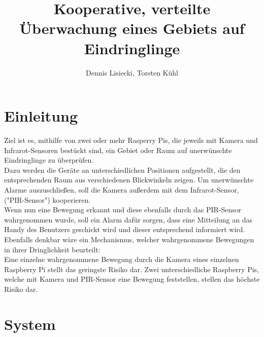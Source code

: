 \documentclass[journal]{IEEEtran}
\title{Kooperative, verteilte Überwachung eines Gebiets auf Eindringlinge}		%
\author{Dennis Lisiecki, Torsten Kühl}								%
\begin{document}

\maketitle	%




\section{Einleitung} 
Ziel ist es, mithilfe von zwei oder mehr Rasperry Pis, die jeweils mit Kamera und Infrarot-Sensoren bestückt sind, ein Gebiet oder Raum auf unerwünschte Eindringlinge zu überprüfen.\\ Dazu werden die Geräte an unterschiedlichen Positionen aufgestellt, die den entsprechenden Raum aus verschiedenen Blickwinkeln zeigen. Um unerwünschte Alarme auszuschließen, soll die Kamera außerdem mit dem Infrarot-Sensor, ("PIR-Sensor") kooperieren. \\ Wenn nun eine Bewegung erkannt und diese ebenfalls durch das PIR-Sensor wahrgenommen wurde, soll ein Alarm dafür sorgen, dass eine Mitteilung an das Handy des Benutzers geschickt wird und dieser entsprechend informiert wird.\\ Ebenfalls denkbar wäre ein Mechanismus, welcher wahrgenommene Bewegungen in ihrer Dringlichkeit beurteilt:\\ Eine einzelne wahrgenommene Bewegung durch die Kamera eines einzelnen Raspberry Pi stellt das geringste Risiko dar. Zwei unterschiedliche Raspberry Pis, welche mit Kamera und PIR-Sensor eine Bewegung feststellen, stellen das höchste Risiko dar.




\section{System}
\end{document}
